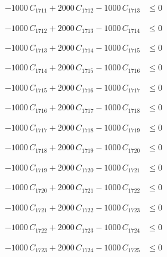 \documentclass[a4paper,11pt]{article}
\begin{document}
\begin{align}
-1000\,C_{1711} + 2000\,C_{1712} - 1000\,C_{1713} &\leq 0 \nonumber
\end{align}

\begin{align}
-1000\,C_{1712} + 2000\,C_{1713} - 1000\,C_{1714} &\leq 0 \nonumber
\end{align}

\begin{align}
-1000\,C_{1713} + 2000\,C_{1714} - 1000\,C_{1715} &\leq 0 \nonumber
\end{align}

\begin{align}
-1000\,C_{1714} + 2000\,C_{1715} - 1000\,C_{1716} &\leq 0 \nonumber
\end{align}

\begin{align}
-1000\,C_{1715} + 2000\,C_{1716} - 1000\,C_{1717} &\leq 0 \nonumber
\end{align}

\begin{align}
-1000\,C_{1716} + 2000\,C_{1717} - 1000\,C_{1718} &\leq 0 \nonumber
\end{align}

\begin{align}
-1000\,C_{1717} + 2000\,C_{1718} - 1000\,C_{1719} &\leq 0 \nonumber
\end{align}

\begin{align}
-1000\,C_{1718} + 2000\,C_{1719} - 1000\,C_{1720} &\leq 0 \nonumber
\end{align}

\begin{align}
-1000\,C_{1719} + 2000\,C_{1720} - 1000\,C_{1721} &\leq 0 \nonumber
\end{align}

\begin{align}
-1000\,C_{1720} + 2000\,C_{1721} - 1000\,C_{1722} &\leq 0 \nonumber
\end{align}

\begin{align}
-1000\,C_{1721} + 2000\,C_{1722} - 1000\,C_{1723} &\leq 0 \nonumber
\end{align}

\begin{align}
-1000\,C_{1722} + 2000\,C_{1723} - 1000\,C_{1724} &\leq 0 \nonumber
\end{align}

\begin{align}
-1000\,C_{1723} + 2000\,C_{1724} - 1000\,C_{1725} &\leq 0 \nonumber
\end{align}
\end{document}
